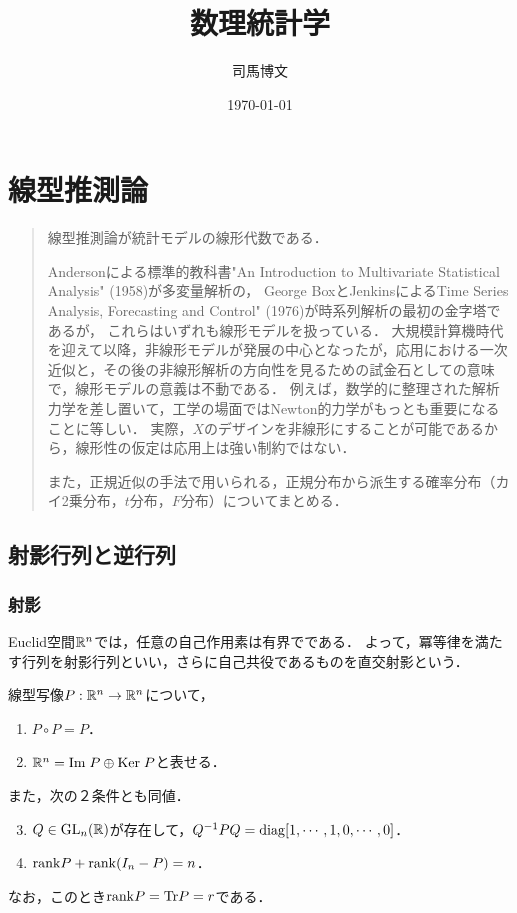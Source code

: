\documentclass[uplatex,dvipdfmx]{jsreport}
\title{数理統計学}
\author{司馬博文}
\date{\today}
\begin{document}
\tableofcontents

\chapter{線型推測論}

\begin{quotation}
    線型推測論が統計モデルの線形代数である．

    Andersonによる標準的教科書"An Introduction to Multivariate Statistical Analysis" (1958)が多変量解析の，
    George BoxとJenkinsによるTime Series Analysis, Forecasting and Control" (1976)が時系列解析の最初の金字塔であるが，
    これらはいずれも線形モデルを扱っている．
    大規模計算機時代を迎えて以降，非線形モデルが発展の中心となったが，応用における一次近似と，その後の非線形解析の方向性を見るための試金石としての意味で，線形モデルの意義は不動である．
    例えば，数学的に整理された解析力学を差し置いて，工学の場面ではNewton的力学がもっとも重要になることに等しい．
    実際，$X$のデザインを非線形にすることが可能であるから，線形性の仮定は応用上は強い制約ではない．

    また，正規近似の手法で用いられる，正規分布から派生する確率分布（カイ2乗分布，$t$分布，$F$分布）についてまとめる．
\end{quotation}

\section{射影行列と逆行列}

\subsection{射影}

\begin{tcolorbox}[colframe=ForestGreen, colback=ForestGreen!10!white,breakable,colbacktitle=ForestGreen!40!white,coltitle=black,fonttitle=\bfseries\sffamily,
title=]
    Euclid空間$\mathbb{R}^n$では，任意の自己作用素は有界でである．
    よって，冪等律を満たす行列を射影行列といい，さらに自己共役であるものを直交射影という．
\end{tcolorbox}

\begin{lemma}[射影の特徴付け]
    線型写像$P:\mathbb{R}^n\to\mathbb{R}^n$について，
    \begin{enumerate}
        \item $P\circ P=P$．
        \item $\mathbb{R}^n=\mathrm{Im}\; P\oplus\mathrm{Ker}\; P$と表せる．
    \end{enumerate}
    また，次の２条件とも同値．
    \begin{enumerate}\setcounter{enumi}{2}
        \item $Q\in\mathrm{GL}_n(\mathbb{R})$が存在して，$Q^{-1}PQ=\mathrm{diag}[1,\cdots,1,0,\cdots,0]$．
        \item $\mathrm{rank} P+\mathrm{rank}(I_n-P)=n$．
    \end{enumerate}
    なお，このとき$\mathrm{rank} P=\mathrm{Tr} P=r$である．
\end{lemma}
\end{document}
